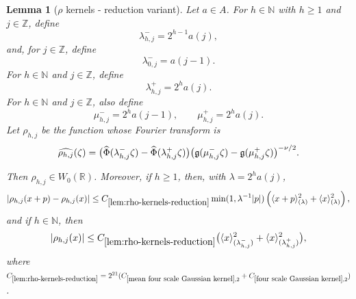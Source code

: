 \documentclass[12pt,reqno]{amsart}
\theoremstyle{plain}
\newtheorem{lemma}[theorem]{Lemma}
\numberwithin{equation}{section}
\theoremstyle{remark}
\newcommand{\using}[1]{}
\newcommand{\Z}{{\mathbb Z}}
\newcommand{\N}{{\mathbb N}}
\begin{document}
\begin{lemma}[$\rho$ kernels - reduction variant] \label{lem:rho-kernels-reduction}\using{mean four scale Gaussian kernel}\using{standard bump properties}\using{four scale Gaussian kernel}  Let $a\in A$. For $h\in\N$ with $h\ge1$ and $j\in\Z$, define
\begin{equation}\label{auto:rho-lambda-scales}
\lambda_{h,j}^-=2^{h-1}a(j),
\end{equation}
and, for $j\in\Z$, define
\begin{equation}\label{auto:rho-lambda-zero-scale}
\lambda_{0,j}^-=a(j-1).
\end{equation}
For $h\in\N$ and $j\in\Z$, define
\begin{equation}\label{auto:rho-lambda-upper-scale}
\lambda_{h,j}^+=2^ha(j).
\end{equation}
For $h\in\N$ and $j\in\Z$, also define
\begin{equation}\label{auto:rho-mu-scales}
\mu_{h,j}^-=2^ha(j-1),
\qquad
\mu_{h,j}^+=2^ha(j).
\end{equation}
Let \(\rho_{h,j}\) be the function whose Fourier transform is
\begin{equation}\label{auto:rho-kernel-Fourier-transform}
\widehat{\rho_{h,j}}(\zeta)
=
\bigl(
\widehat\Phi(\lambda_{h,j}^-\zeta)
-
\widehat\Phi(\lambda_{h,j}^+\zeta)
\bigr)
\bigl(
\mathfrak{g}(\mu_{h,j}^-\zeta)
-
\mathfrak{g}(\mu_{h,j}^+\zeta)
\bigr)^{-\nu/2}.
\end{equation}

Then \(\rho_{h,j}\in W_0(\mathbb R)\). Moreover, if \(h\geq1\), then, with $\lambda=2^ha(j)$,
\begin{equation}
    \label{E:increase-data-rho-mean-estimate}
    |\rho_{h,j}(x+p)-\rho_{h,j}(x)|
    \leq
    C_{\ref{lem:rho-kernels-reduction}}
    \min(1,\lambda^{-1}|p|)
    \left(
    \langle x+p\rangle_{(\lambda)}^2
    +
    \langle x\rangle_{(\lambda)}^2
    \right),
\end{equation}
and if $h\in \N$, then
\begin{equation}
    \label{E:increase-data-rho-zero-estimate}
    |\rho_{h,j}(x)|
    \leq
    C_{\ref{lem:rho-kernels-reduction}}
    \big(
    \langle x\rangle_{(\lambda_{h,j}^-)}^2
    +
    \langle x\rangle_{(\lambda_{h,j}^+)}^2
    \big),
\end{equation}
where $C_{\ref{lem:rho-kernels-reduction}} = 2^{21} (C_{\ref{mean four scale Gaussian kernel},2}+C_{\ref{four scale Gaussian kernel},2})$.
\end{lemma}
\end{document}
